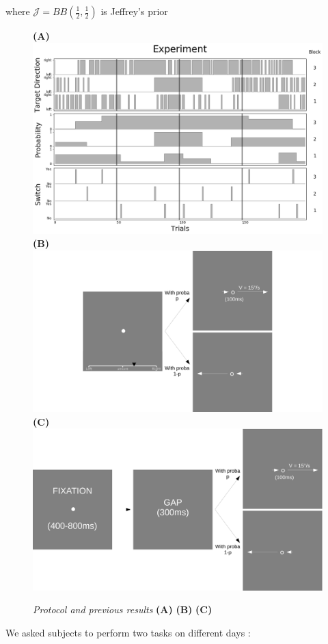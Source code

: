 \documentclass[profile,final,english, draft]{article}%
\newcommand{\Jj}{\mathcal{J}}
\begin{document}
where $\Jj = BB(\frac 1 2 , \frac 1 2 )$ is Jeffrey's prior
\begin{figure}%
\begin{center}
\textbf{(A)}     \includegraphics[width=.9\linewidth]{exp}
\textbf{(B)}     \includegraphics[width=.4\linewidth]{materiel_bet}
\textbf{(C)}     \includegraphics[width=.4\linewidth]{materiel_recording}
\end{center}
\caption{\emph{Protocol and previous results} \textbf{(A)} 
\textbf{(B)} 
\textbf{(C)}  }
\label{fig:protocole}
\end{figure}

We asked subjects to perform two tasks on different days :
\end{document}
